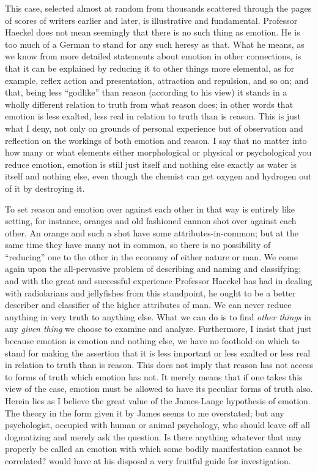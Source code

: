 \documentclass[a4paper, 11pt, oneside, polutonikogreek, english, landscape]{article}
\begin{document}
This case, selected almost at random from thousands scattered through the pages of scores of writers earlier and later, is illustrative and fundamental. Professor Haeckel does not mean seemingly that there is no such thing as emotion. He is too much of a German to stand for any such heresy as that. What he means, as we know from more detailed statements about emotion in other connections, is that it can be explained by reducing it to other things more elemental, as for example, reflex action and presentation, attraction and repulsion, and so on; and that, being less ``godlike'' than reason (according to his view) it stands in a wholly different relation to truth from what reason does; in other words that emotion is less exalted, less real in relation to truth than is reason. This is just what I deny, not only on grounds of personal experience but of observation and reflection on the workings of both emotion and reason. I say that no matter into how many or what elements either morphological or physical or psychological you reduce emotion, emotion is still just itself and nothing else exactly as water is itself and nothing else, even though the chemist can get oxygen and hydrogen out of it by destroying it.

To set reason and emotion over against each other in that way is entirely like setting, for instance, oranges and old fashioned cannon shot over against each other. An orange and such a shot have some attributes-in-common; but at the same time they have many not in common, so there is no possibility of ``reducing'' one to the other in the economy of either nature or man. We come again upon the all-pervasive problem of describing and naming and classifying; and with the great and successful experience Professor Haeckel has had in dealing with radiolarians and jellyfishes from this standpoint, he ought to be a better describer and classifier of the higher attributes of man. We can never reduce anything in very truth to anything else. What we can do is to find \emph{other things} in any \emph{given thing} we choose to examine and analyze. Furthermore, I insist that just because emotion is emotion and nothing else, we have no foothold on which to stand for making the assertion that it is less important or less exalted or less real in relation to truth than is reason. This does not imply that reason has not access to forms of truth which emotion has not. It merely means that if one takes this view of the case, emotion must be allowed to have its peculiar forms of truth also. Herein lies as I believe the great value of the James-Lange hypothesis of emotion. The theory in the form given it by James seems to me overstated; but any psychologist, occupied with human or animal psychology, who should leave off all dogmatizing and merely ask the question. Is there anything whatever that may properly be called an emotion with which some bodily manifestation cannot be correlated? would have at his disposal a very fruitful guide for investigation.
\end{document}
